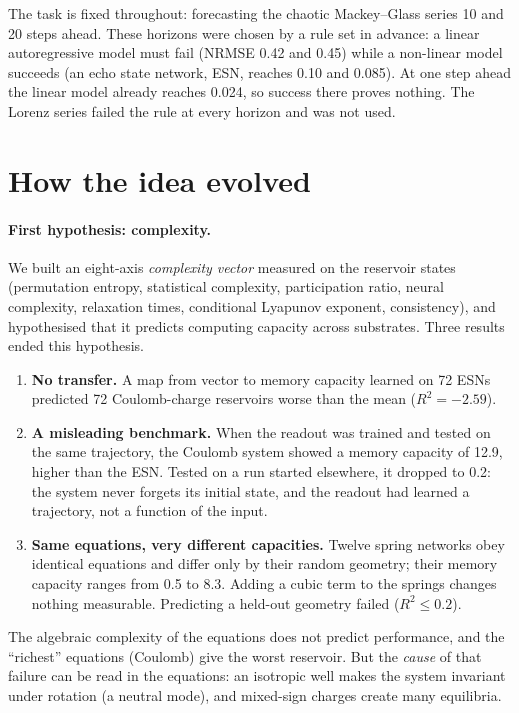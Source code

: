 \documentclass[10pt,a4paper]{article}
\begin{document}
The task is fixed throughout: forecasting the chaotic Mackey--Glass series \cite{mackey1977}
10 and 20 steps ahead. These horizons were chosen by a rule set in advance: a linear
autoregressive model must fail (NRMSE 0.42 and 0.45) while a non-linear model succeeds (an
echo state network, ESN, reaches 0.10 and 0.085). At one step ahead the linear model already
reaches 0.024, so success there proves nothing. The Lorenz series failed the rule at every
horizon and was not used.

\section{How the idea evolved}

\paragraph{First hypothesis: complexity.} We built an eight-axis \emph{complexity vector}
measured on the reservoir states (permutation entropy, statistical complexity, participation
ratio, neural complexity, relaxation times, conditional Lyapunov exponent, consistency), and
hypothesised that it predicts computing capacity across substrates. Three results ended this
hypothesis.
\begin{enumerate}
  \item \textbf{No transfer.} A map from vector to memory capacity learned on 72 ESNs
        predicted 72 Coulomb-charge reservoirs worse than the mean ($R^2 = -2.59$).
  \item \textbf{A misleading benchmark.} When the readout was trained and tested on the same
        trajectory, the Coulomb system showed a memory capacity of 12.9, higher than the ESN.
        Tested on a run started elsewhere, it dropped to 0.2: the system never forgets its
        initial state, and the readout had learned a trajectory, not a function of the input.
  \item \textbf{Same equations, very different capacities.} Twelve spring networks obey
        identical equations and differ only by their random geometry; their memory capacity
        ranges from 0.5 to 8.3. Adding a cubic term to the springs changes nothing measurable.
        Predicting a held-out geometry failed ($R^2 \le 0.2$).
\end{enumerate}
The algebraic complexity of the equations does not predict performance, and the ``richest''
equations (Coulomb) give the worst reservoir. But the \emph{cause} of that failure can be read
in the equations: an isotropic well makes the system invariant under rotation (a neutral mode),
and mixed-sign charges create many equilibria.
\end{document}

